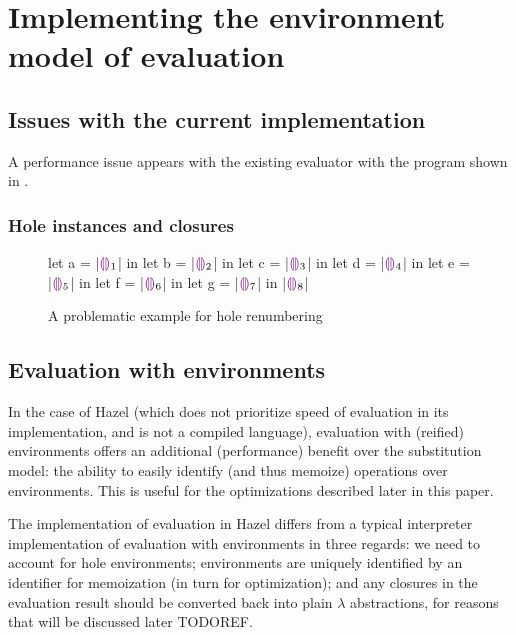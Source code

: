 \section{Implementing the environment model of evaluation}
\label{sec:env_model_evaluation}

\subsection{Issues with the current implementation}
\label{sec:current_problems}

A performance issue appears with the existing evaluator with the program shown in .



\subsubsection{Hole instances and closures}
\label{sec:hole_instances_and_closures}

\begin{figure}
  \centering
  \begin{hminted}
let a = |$\textcolor{violet}{\llparenthesis}\textcolor{violet}{\rrparenthesis}_1$| in
let b = |$\textcolor{violet}{\llparenthesis}\textcolor{violet}{\rrparenthesis}_2$| in
let c = |$\textcolor{violet}{\llparenthesis}\textcolor{violet}{\rrparenthesis}_3$| in
let d = |$\textcolor{violet}{\llparenthesis}\textcolor{violet}{\rrparenthesis}_4$| in
let e = |$\textcolor{violet}{\llparenthesis}\textcolor{violet}{\rrparenthesis}_5$| in
let f = |$\textcolor{violet}{\llparenthesis}\textcolor{violet}{\rrparenthesis}_6$| in
let g = |$\textcolor{violet}{\llparenthesis}\textcolor{violet}{\rrparenthesis}_7$| in
|$\textcolor{violet}{\llparenthesis}\textcolor{violet}{\rrparenthesis}_8$|
  \end{hminted}
  \caption{A problematic example for hole renumbering}
  \label{fig:hole_renumbering_problem}
\end{figure}

\subsection{Evaluation with environments}
\label{sec:eval_with_envs}

In the case of Hazel (which does not prioritize speed of evaluation in its implementation, and is not a compiled language), evaluation with (reified) environments offers an additional (performance) benefit over the substitution model: the ability to easily identify (and thus memoize) operations over environments. This is useful for the optimizations described later in this paper.

The implementation of evaluation in Hazel differs from a typical interpreter implementation of evaluation with environments in three regards: we need to account for hole environments; environments are uniquely identified by an identifier for memoization (in turn for optimization); and any closures in the evaluation result should be converted back into plain $\lambda$ abstractions, for reasons that will be discussed later TODOREF.

